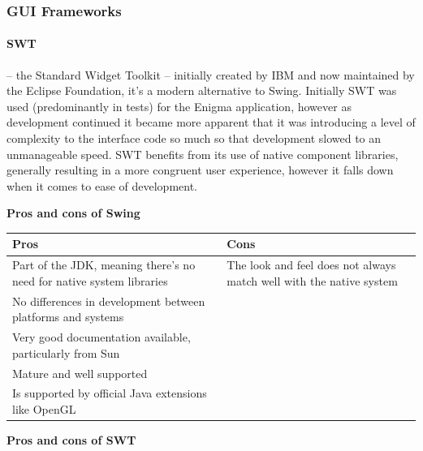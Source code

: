     \subsubsection{GUI Frameworks}
    
      \paragraph{SWT} -- the Standard Widget Toolkit -- initially created by IBM and now maintained by the Eclipse Foundation, it's a modern alternative to Swing. Initially SWT was used (predominantly in tests) for the Enigma application, however as development continued it became more apparent that it was introducing a level of complexity to the interface code so much so that development slowed to an unmanageable speed. SWT benefits from its use of native component libraries, generally resulting in a more congruent user experience, however it falls down when it comes to ease of development.
      
      \textbf{Pros and cons of Swing}
      
       \begin{center}
       \begin{tabular}{ | p{6cm} | p{6cm} |}
          \hline
          Pros & Cons \\ \hline \hline
          Part of the JDK, meaning there's no need for native system libraries & The look and feel does not always match well with the native system \\ \hline
          No differences in development between platforms and systems & \\ \hline
          Very good documentation available, particularly from Sun & \\ \hline
          Mature and well supported & \\ \hline
          Is supported by official Java extensions like OpenGL & \\
          \hline
        \end{tabular}
      \end{center}
      
      \textbf{Pros and cons of SWT}
      
